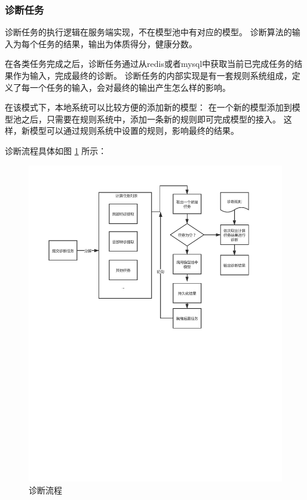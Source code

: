\subsubsection{诊断任务}


诊断任务的执行逻辑在服务端实现，不在模型池中有对应的模型。 诊断算法的输入为每个任务的结果，输出为体质得分，健康分数。

在各类任务完成之后，诊断任务通过从redis或者mysql中获取当前已完成任务的结果作为输入，完成最终的诊断。 
诊断任务的内部实现是有一套规则系统组成，定义了每一个任务的输入，会对最终的输出产生怎么样的影响。

在该模式下，本地系统可以比较方便的添加新的模型： 在一个新的模型添加到模型池之后，只需要在规则系统中，添加一条新的规则即可完成模型的接入。
这样，新模型可以通过规则系统中设置的规则，影响最终的结果。

诊断流程具体如图 \ref{fig:sketch} 所示：

\begin{figure}[ht]
    \centering
    \includegraphics[width=12cm]{images/sketch.pdf}
    \caption{诊断流程}
    \label{fig:sketch}
\end{figure}

